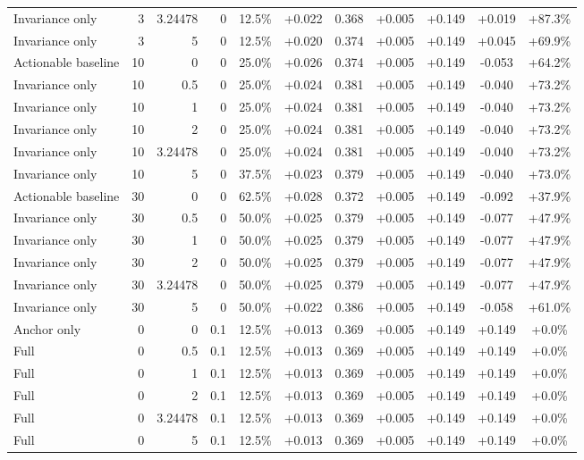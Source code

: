\begin{table}[htbp]
\begin{tabular}{lrrrccccccc}
Invariance only & 3 & 3.24478 & 0 & 12.5\% & +0.022 & 0.368 & +0.005 & +0.149 & +0.019 & +87.3\% \\
Invariance only & 3 & 5 & 0 & 12.5\% & +0.020 & 0.374 & +0.005 & +0.149 & +0.045 & +69.9\% \\
Actionable baseline & 10 & 0 & 0 & 25.0\% & +0.026 & 0.374 & +0.005 & +0.149 & -0.053 & +64.2\% \\
Invariance only & 10 & 0.5 & 0 & 25.0\% & +0.024 & 0.381 & +0.005 & +0.149 & -0.040 & +73.2\% \\
Invariance only & 10 & 1 & 0 & 25.0\% & +0.024 & 0.381 & +0.005 & +0.149 & -0.040 & +73.2\% \\
Invariance only & 10 & 2 & 0 & 25.0\% & +0.024 & 0.381 & +0.005 & +0.149 & -0.040 & +73.2\% \\
Invariance only & 10 & 3.24478 & 0 & 25.0\% & +0.024 & 0.381 & +0.005 & +0.149 & -0.040 & +73.2\% \\
Invariance only & 10 & 5 & 0 & 37.5\% & +0.023 & 0.379 & +0.005 & +0.149 & -0.040 & +73.0\% \\
Actionable baseline & 30 & 0 & 0 & 62.5\% & +0.028 & 0.372 & +0.005 & +0.149 & -0.092 & +37.9\% \\
Invariance only & 30 & 0.5 & 0 & 50.0\% & +0.025 & 0.379 & +0.005 & +0.149 & -0.077 & +47.9\% \\
Invariance only & 30 & 1 & 0 & 50.0\% & +0.025 & 0.379 & +0.005 & +0.149 & -0.077 & +47.9\% \\
Invariance only & 30 & 2 & 0 & 50.0\% & +0.025 & 0.379 & +0.005 & +0.149 & -0.077 & +47.9\% \\
Invariance only & 30 & 3.24478 & 0 & 50.0\% & +0.025 & 0.379 & +0.005 & +0.149 & -0.077 & +47.9\% \\
Invariance only & 30 & 5 & 0 & 50.0\% & +0.022 & 0.386 & +0.005 & +0.149 & -0.058 & +61.0\% \\
Anchor only & 0 & 0 & 0.1 & 12.5\% & +0.013 & 0.369 & +0.005 & +0.149 & +0.149 & +0.0\% \\
Full & 0 & 0.5 & 0.1 & 12.5\% & +0.013 & 0.369 & +0.005 & +0.149 & +0.149 & +0.0\% \\
Full & 0 & 1 & 0.1 & 12.5\% & +0.013 & 0.369 & +0.005 & +0.149 & +0.149 & +0.0\% \\
Full & 0 & 2 & 0.1 & 12.5\% & +0.013 & 0.369 & +0.005 & +0.149 & +0.149 & +0.0\% \\
Full & 0 & 3.24478 & 0.1 & 12.5\% & +0.013 & 0.369 & +0.005 & +0.149 & +0.149 & +0.0\% \\
Full & 0 & 5 & 0.1 & 12.5\% & +0.013 & 0.369 & +0.005 & +0.149 & +0.149 & +0.0\% \\

\end{tabular}
\end{table}
